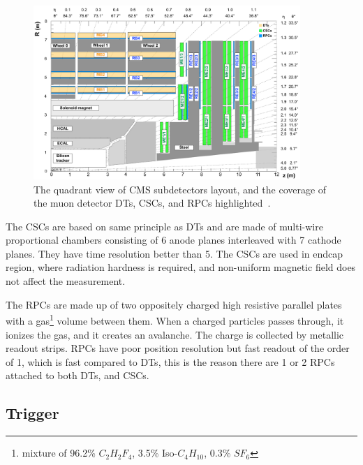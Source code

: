 \begin{figure}[!ht]
  \centering
  \includegraphics[width=0.9\textwidth]{figures/cms_muon_system.pdf}
  \caption[The quadrant view of CMS subdetectors layout, and
    the coverage of the muon detector \glspl{DT}, \glspl{CSC},
    and \glspl{RPC} highlighted]%
  {The quadrant view of CMS subdetectors layout, and
    the coverage of the muon detector \glspl{DT}, \glspl{CSC},
    and \glspl{RPC} highlighted~\cite{image-cms-muon-system}.}%
  \label{fig:cms-muon-system}
\end{figure}

The \glspl{CSC} are based on same principle as \glspl{DT}
and are made of multi-wire proportional chambers consisting of
6 anode planes interleaved with 7 cathode planes. They have time resolution
better than 5\nanoseconds. The \glspl{CSC} are used in endcap region,
where radiation hardness is required, and non-uniform magnetic field does not
affect the measurement.

The \glspl{RPC} are made up of two oppositely charged high resistive parallel
plates with a gas\footnote{mixture of 96.2\% \( C_{2}H_{2}F_{4} \), 3.5\% Iso-\( C_{4}H_{10} \),
0.3\% \( S{F}_{6} \)} volume between them.
When a charged particles passes through, it ionizes the gas, and it creates
an avalanche. The charge is collected by metallic readout strips.
\glspl{RPC} have poor position resolution but fast readout of the order of 1\nanoseconds,
which is fast compared to \glspl{DT}, this is the reason there are 1 or 2 \glspl{RPC}
attached to both \glspl{DT}, and \glspl{CSC}.

\subsection{
  Trigger
}\label{ch_cms:L1T}

